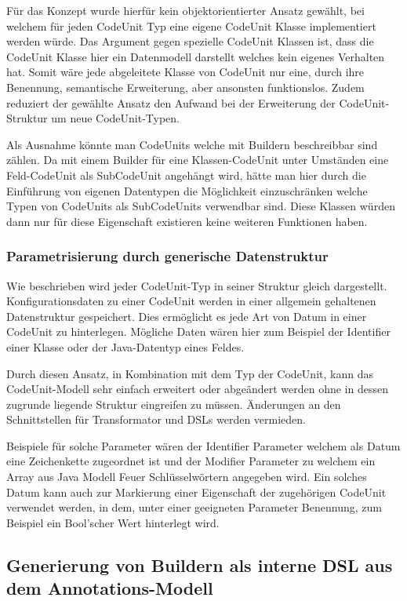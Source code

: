 \documentclass[12pt,oneside,a4paper,parskip]{scrbook}
\begin{document}
Für das Konzept wurde hierfür kein objektorientierter Ansatz gewählt, bei welchem für jeden CodeUnit Typ eine eigene CodeUnit Klasse implementiert werden würde. Das Argument gegen spezielle CodeUnit Klassen ist, dass die CodeUnit Klasse hier ein Datenmodell darstellt welches kein eigenes Verhalten hat. Somit wäre jede abgeleitete Klasse von CodeUnit nur eine, durch ihre Benennung, semantische Erweiterung, aber ansonsten funktionslos. Zudem reduziert der gewählte Ansatz den Aufwand bei der Erweiterung der CodeUnit-Struktur um neue CodeUnit-Typen.

Als Ausnahme könnte man CodeUnits welche mit Buildern beschreibbar sind zählen. Da mit einem Builder für eine Klassen-CodeUnit unter Umständen eine Feld-CodeUnit als SubCodeUnit angehängt wird, hätte man hier durch die Einführung von eigenen Datentypen die Möglichkeit einzuschränken welche Typen von CodeUnits als SubCodeUnits verwendbar sind. Diese Klassen würden dann nur für diese Eigenschaft existieren keine weiteren Funktionen haben.

\subsubsection{Parametrisierung durch generische Datenstruktur}

Wie beschrieben wird jeder CodeUnit-Typ in seiner Struktur gleich dargestellt. Konfigurationsdaten zu einer CodeUnit werden in einer allgemein gehaltenen Datenstruktur gespeichert. Dies ermöglicht es jede Art von Datum in einer CodeUnit zu hinterlegen. Mögliche Daten wären hier zum Beispiel der Identifier einer Klasse oder der Java-Datentyp eines Feldes.

Durch diesen Ansatz, in Kombination mit dem Typ der CodeUnit, kann das CodeUnit-Modell sehr einfach erweitert oder abgeändert werden ohne in dessen zugrunde liegende Struktur eingreifen zu müssen. Änderungen an den Schnittstellen für Transformator und DSLs werden vermieden.

Beispiele für solche Parameter wären der Identifier Parameter welchem als Datum eine Zeichenkette zugeordnet ist und der Modifier Parameter zu welchem ein Array aus Java Modell Feuer Schlüsselwörtern angegeben wird. Ein solches Datum kann auch zur Markierung einer Eigenschaft der zugehörigen CodeUnit verwendet werden, in dem, unter einer geeigneten Parameter Benennung, zum Beispiel ein Bool'scher Wert hinterlegt wird.

\subsection{Generierung von Buildern als interne DSL aus dem Annotations-Modell}
\end{document}
